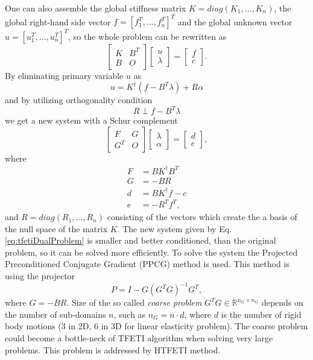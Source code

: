 One can also assemble the global stiffness matrix $K = diag\left( K_1, \ldots, K_n \right)$, the global right-hand side vector $f = \left[ f_1^T, \ldots, f_n^T \right]^T$ and the global unknown vector $u = \left[ u_1^T, \ldots, u_n^T \right]^T$,
so the whole problem can be rewritten as 
\begin{equation}
\begin{bmatrix}
K & B^T\\
B & O
\end{bmatrix}
\begin{bmatrix}
u\\
\lambda
\end{bmatrix}
=
\begin{bmatrix}
f\\
c
\end{bmatrix}.
\label{eq:tfetiGlobProb}
\end{equation}
By eliminating primary variable $u$ as 
\begin{equation}
u = K^\dagger \left( f - B^T \lambda \right) + R\alpha
\label{eq:elimUVar}
\end{equation}
and by utilizing orthogonality condition 
\begin{equation}
R \perp f - B^T \lambda
\label{eq:tfetiOrthogCond}
\end{equation}
we get a new system with a Schur complement
\begin{equation}
\begin{bmatrix}
F & G \\
G^T & O
\end{bmatrix}
\begin{bmatrix}
\lambda\\
\alpha
\end{bmatrix}
=
\begin{bmatrix}
d\\
e
\end{bmatrix},
\label{eq:tfetiDualProblem}
\end{equation}
where 
\begin{align}
F &= BK^\dagger B^T\\
G &= -BR\\
d &= BK^\dagger f - c\\
e &= -R^T f^T,\end{align}
and $R = diag\left( R_1, \ldots, R_n \right)$ consisting of the vectors which create the a basis of the null space of the matrix $K$.
The new system given by Eq. \eqref{eq:tfetiDualProblem} is smaller and better conditioned, than the original problem, so it can be solved more efficiently. To solve the system the Projected Preconditioned Conjugate Gradient (PPCG) method is used. This method is using the projector 
\begin{equation}
P = I - G\left( G^T G \right)^{-1} G^T,
\end{equation}
where $G = -BR$. Size of the so called \textit{coarse problem} $G^T G \in \mathbb{R}^{n_G \times n_G}$ depends on the number of sub-domains $n$, such as
$n_G = n \cdot d$, where $d$ is the number of rigid body motions (3 in 2D, 6 in 3D for linear elasticity problem). The coarse problem could become a bottle-neck of TFETI algorithm when solving very large problems. This problem is addressed by HTFETI method.


